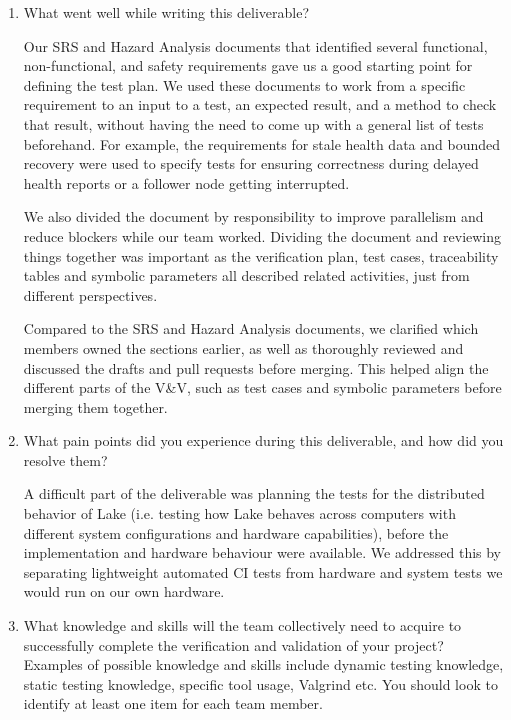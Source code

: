 \documentclass[12pt, titlepage]{article}
\begin{document}
\begin{enumerate}
  \item What went well while writing this deliverable?

Our SRS and Hazard Analysis documents that identified several functional, non-functional, and safety requirements gave us a good starting point for defining the test plan. We used these documents to work from a specific requirement to an input to a test, an expected result, and a method to check that result, without having the need to come up with a general list of tests beforehand. For example, the requirements for stale health data and bounded recovery were used to specify tests for ensuring correctness during delayed health reports or a follower node getting interrupted.

We also divided the document by responsibility to improve parallelism and reduce blockers while our team worked. Dividing the document and reviewing things together was important as the verification plan, test cases, traceability tables and symbolic parameters all described related activities, just from different perspectives.

Compared to the SRS and Hazard Analysis documents, we clarified which members owned the sections earlier, as well as thoroughly reviewed and discussed the drafts and pull requests before merging. This helped align the different parts of the V\&V, such as test cases and symbolic parameters before merging them together.
  \item What pain points did you experience during this deliverable, and how
    did you resolve them?

A difficult part of the deliverable was planning the tests for the distributed behavior of Lake (i.e. testing how Lake behaves across computers with different system configurations and hardware capabilities), before the implementation and hardware behaviour were available. We addressed this by separating lightweight automated CI tests from hardware and system tests we would run on our own hardware.

  \item What knowledge and skills will the team collectively need to acquire to
  successfully complete the verification and validation of your project?
  Examples of possible knowledge and skills include dynamic testing knowledge,
  static testing knowledge, specific tool usage, Valgrind etc.  You should look to
  identify at least one item for each team member.


\end{enumerate}
\end{document}
